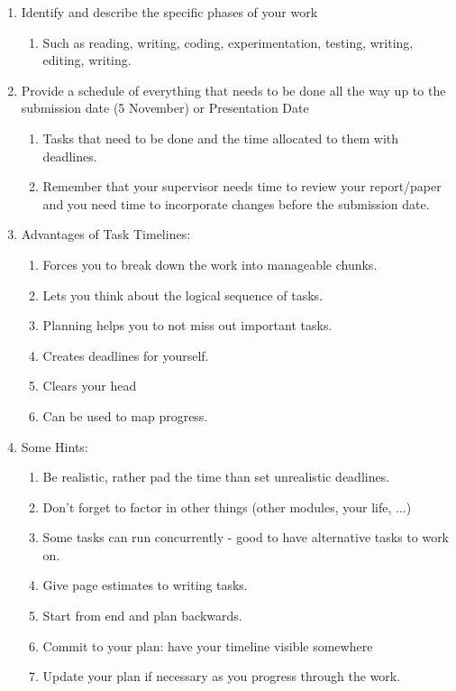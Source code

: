 \documentclass[runningheads,a4paper]{llncs}
\begin{document}
\begin{enumerate}

 \item Identify and describe the specific phases of your work
 \begin{enumerate}
  \item Such as reading, writing, coding, experimentation, testing, writing, editing, writing.
 \end{enumerate}
 
 \item Provide a schedule of everything that needs to be done all the way up to the submission date (5 November) or Presentation Date
 \begin{enumerate}
  \item Tasks that need to be done and the time allocated to them with deadlines.
  \item Remember that your supervisor needs time to review your report/paper and you need time to incorporate changes before the submission date.
 \end{enumerate}
 
 \item Advantages of Task Timelines:
 \begin{enumerate}
  \item Forces you to break down the work into manageable chunks.
  \item Lets you think about the logical sequence of tasks.
  \item Planning helps you to not miss out important tasks.
  \item Creates deadlines for yourself.
  \item Clears your head
  \item Can be used to map progress.
 \end{enumerate}
 
 \item Some Hints:
 \begin{enumerate}
  \item Be realistic, rather pad the time than set unrealistic deadlines.
  \item Don't forget to factor in other things (other modules, your life, ...)
  \item Some tasks can run concurrently - good to have alternative tasks to work on.
  \item Give page estimates to writing tasks.
  \item Start from end and plan backwards.
  \item Commit to your plan: have your timeline visible somewhere
  \item Update your plan if necessary as you progress through the work.
 \end{enumerate}

\end{enumerate}
\end{document}
